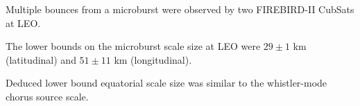 \documentclass[draft, linenumbers]{agujournal}
\begin{document}






\begin{keypoints}
\item Multiple bounces from a microburst were observed by two FIREBIRD-II CubSats at LEO.
\item The lower bounds on the microburst scale size at LEO were $29 \pm 1$ km (latitudinal) and $51 \pm 11$ km (longitudinal).
\item Deduced lower bound equatorial scale size was similar to the whistler-mode chorus source scale.
\end{keypoints}

%
%

\end{document}

